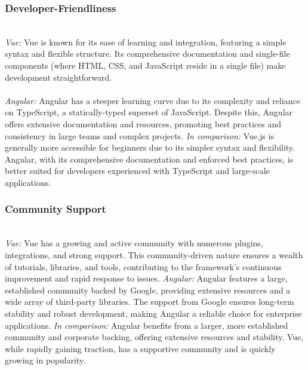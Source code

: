\documentclass[conference]{IEEEtran}
\begin{document}
\subsubsection{Developer-Friendliness}
\textit{\\Vue:} Vue is known for its ease of learning and integration, featuring a simple syntax and flexible structure. Its comprehensive documentation and single-file components (where HTML, CSS, and JavaScript reside in a single file) make development straightforward.
\newline\textit{\\\\Angular:} Angular has a steeper learning curve due to its complexity and reliance on TypeScript, a statically-typed superset of JavaScript. Despite this, Angular offers extensive documentation and resources, promoting best practices and consistency in large teams and complex projects.
\newline\textit{In comparison:} Vue.js is generally more accessible for beginners due to its simpler syntax and flexibility. Angular, with its comprehensive documentation and enforced best practices, is better suited for developers experienced with TypeScript and large-scale applications.
\newline
\subsubsection{Community Support}
\textit{\\Vue:} Vue has a growing and active community with numerous plugins, integrations, and strong support. This community-driven nature ensures a wealth of tutorials, libraries, and tools, contributing to the framework’s continuous improvement and rapid response to issues.
\newline\textit{Angular:} Angular features a large, established community backed by Google, providing extensive resources and a wide array of third-party libraries. The support from Google ensures long-term stability and robust development, making Angular a reliable choice for enterprise applications.
\newline\textit{In comparison:} Angular benefits from a larger, more established community and corporate backing, offering extensive resources and stability. Vue, while rapidly gaining traction, has a supportive community and is quickly growing in popularity.
\newline
\end{document}
